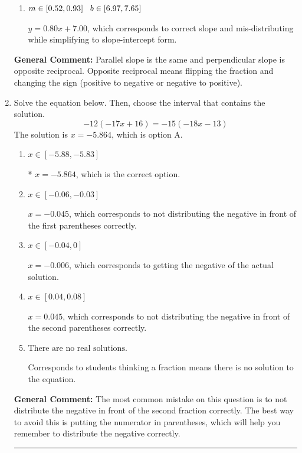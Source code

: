 \documentclass{extbook}[14pt]
\newcommand{\litem}[1]{\item #1

\rule{\textwidth}{0.4pt}}
\begin{document}
\begin{enumerate}
{\begin{enumerate}[label=\Alph*.]
 $y = 0.80x - 6.00$, which corresponds to using the correct slope and getting the negative $y$-intercept.
\item \( m \in [0.52, 0.93] \hspace*{3mm} b \in [6.97, 7.65] \)

 $y = 0.80x + 7.00$, which corresponds to correct slope and mis-distributing while simplifying to slope-intercept form.
\end{enumerate}

\textbf{General Comment:} Parallel slope is the same and perpendicular slope is opposite reciprocal. Opposite reciprocal means flipping the fraction and changing the sign (positive to negative or negative to positive).
}
\litem{
Solve the equation below. Then, choose the interval that contains the solution.
\[ -12(-17x + 16) = -15(-18x -13) \]The solution is \( x = -5.864 \), which is option A.\begin{enumerate}[label=\Alph*.]
\item \( x \in [-5.88, -5.83] \)

* $x = -5.864$, which is the correct option.
\item \( x \in [-0.06, -0.03] \)

$x = -0.045$, which corresponds to not distributing the negative in front of the first parentheses correctly.
\item \( x \in [-0.04, 0] \)

$x = -0.006$, which corresponds to getting the negative of the actual solution.
\item \( x \in [0.04, 0.08] \)

$x = 0.045$, which corresponds to not distributing the negative in front of the second parentheses correctly.
\item \( \text{There are no real solutions.} \)

Corresponds to students thinking a fraction means there is no solution to the equation.
\end{enumerate}

\textbf{General Comment:} The most common mistake on this question is to not distribute the negative in front of the second fraction correctly. The best way to avoid this is putting the numerator in parentheses, which will help you remember to distribute the negative correctly.
}
\end{enumerate}
\end{document}
